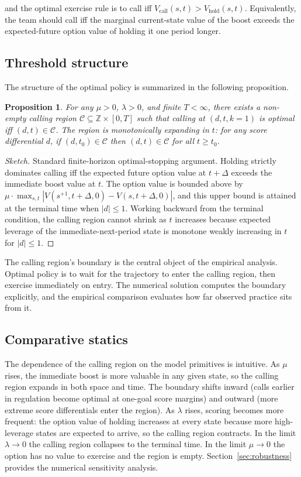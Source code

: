 \documentclass[11pt]{article}
\newtheorem{proposition}{Proposition}
\begin{document}
\noindent and the optimal exercise rule is to call iff $V_{\mathrm{call}}(s, t) > V_{\mathrm{hold}}(s, t)$. Equivalently, the team should call iff the marginal current-state value of the boost exceeds the expected-future option value of holding it one period longer.

\subsection{Threshold structure}

The structure of the optimal policy is summarized in the following proposition.

\begin{proposition}\label{prop:threshold}
For any $\mu > 0$, $\lambda > 0$, and finite $T < \infty$, there exists a non-empty calling region $\mathcal{C} \subseteq \mathbb{Z} \times [0, T]$ such that calling at $(d, t, k=1)$ is optimal iff $(d, t) \in \mathcal{C}$. The region is monotonically expanding in $t$: for any score differential $d$, if $(d, t_0) \in \mathcal{C}$ then $(d, t) \in \mathcal{C}$ for all $t \geq t_0$.
\end{proposition}

\begin{proof}[Sketch]
Standard finite-horizon optimal-stopping argument. Holding strictly dominates calling iff the expected future option value at $t + \Delta$ exceeds the immediate boost value at $t$. The option value is bounded above by $\mu \cdot \max_{s, t} |V(s^{+1}, t+\Delta, 0) - V(s, t+\Delta, 0)|$, and this upper bound is attained at the terminal time when $|d| \leq 1$. Working backward from the terminal condition, the calling region cannot shrink as $t$ increases because expected leverage of the immediate-next-period state is monotone weakly increasing in $t$ for $|d| \leq 1$.
\end{proof}

The calling region's boundary is the central object of the empirical analysis. Optimal policy is to wait for the trajectory to enter the calling region, then exercise immediately on entry. The numerical solution computes the boundary explicitly, and the empirical comparison evaluates how far observed practice sits from it.

\subsection{Comparative statics}

The dependence of the calling region on the model primitives is intuitive. As $\mu$ rises, the immediate boost is more valuable in any given state, so the calling region expands in both space and time. The boundary shifts inward (calls earlier in regulation become optimal at one-goal score margins) and outward (more extreme score differentials enter the region). As $\lambda$ rises, scoring becomes more frequent: the option value of holding increases at every state because more high-leverage states are expected to arrive, so the calling region contracts. In the limit $\lambda \to 0$ the calling region collapses to the terminal time. In the limit $\mu \to 0$ the option has no value to exercise and the region is empty. Section~\ref{sec:robustness} provides the numerical sensitivity analysis.
\end{document}

